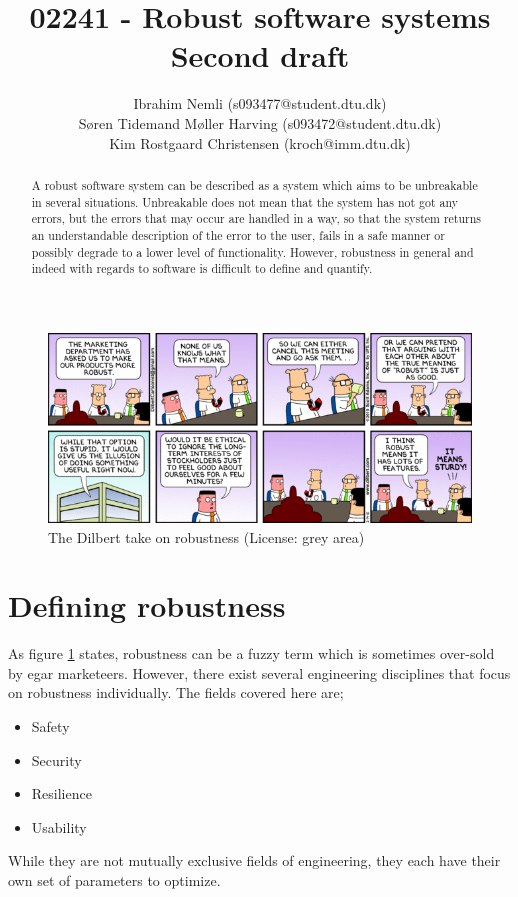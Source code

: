 \documentclass[10pt,a4paper]{article}
\begin{document}
\author{
  Ibrahim Nemli (s093477@student.dtu.dk)\\
  Søren Tidemand Møller Harving (s093472@student.dtu.dk) \\
  Kim Rostgaard Christensen (kroch@imm.dtu.dk)
}
\title{02241 - Robust software systems \\
	Second draft
}

\maketitle

\begin{abstract}
A robust software system can be described as a system which aims to be unbreakable in several situations. Unbreakable does not mean that the system has not got any errors, but the errors that may occur are handled in a way, so that the system returns an understandable description of the error to the user, fails in a safe manner or possibly degrade to a lower level of functionality. However, robustness in general and indeed with regards to software is difficult to define and quantify.
\end{abstract}

\tableofcontents
\newpage
\begin{figure}[h]
\centering
\includegraphics[scale=0.4]{fig/dilbert_robust.png}
 \caption{The Dilbert take on robustness (License: grey area)}
 \label{fig:dilber_robustness}
\end{figure}


\section{Defining robustness}
As figure \ref{fig:dilber_robustness} states, robustness can be a fuzzy term which is sometimes over-sold by egar marketeers.
However, there exist several engineering disciplines that focus on robustness individually. The fields covered here are;
\begin{itemize}
\item Safety
\item Security
\item Resilience
\item Usability
\end{itemize}
While they are not mutually exclusive fields of engineering, they each have their own set of parameters to optimize.
\end{document}

